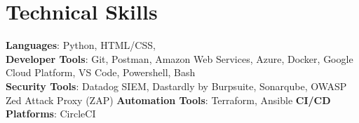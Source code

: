 \documentclass[letterpaper,11pt]{article}
\begin{document}
%
\section{Technical Skills}
 \begin{itemize}[leftmargin=0.15in, label={}]
    \small{\item{
     \textbf{Languages}{: Python, HTML/CSS,} \\
     \textbf{Developer Tools}{: Git, Postman, Amazon Web Services, Azure, Docker, Google Cloud Platform, VS Code, Powershell, Bash } \\
     \textbf{Security Tools}{: Datadog SIEM, Dastardly by Burpsuite, Sonarqube, OWASP Zed Attack Proxy (ZAP) }
     \textbf{Automation Tools}{: Terraform, Ansible }
     \textbf{CI/CD Platforms}{: CircleCI}

    }}
 \end{itemize}


\end{document}
